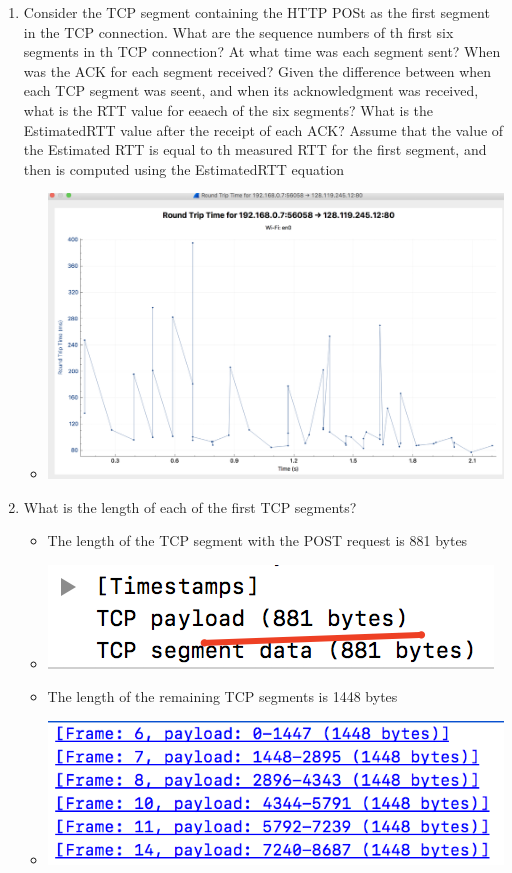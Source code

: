 \documentclass{article}
\begin{document}
\begin{enumerate}
    \item Consider the TCP segment containing the HTTP POSt as the first segment in the TCP connection.  What are the sequence numbers of th first six segments in th TCP connection?  At what time was each segment sent?  When was the ACK for each segment received?  Given the difference between when each TCP segment was seent, and when its acknowledgment was received, what is the RTT value for eeaech of the six segments?  What is the EstimatedRTT value after the receipt of each ACK?  Assume that the value of the Estimated RTT is equal to th measured RTT for the first segment, and then is computed using the EstimatedRTT equation
        \begin{itemize}
          \item \includegraphics[scale=0.3]{images/TCPRTT.png}
        \end{itemize}
    \item What is the length of each of the first TCP segments?
        \begin{itemize}
          \item The length of the TCP segment with the POST request is 881 bytes
          \item \includegraphics[scale=0.5]{images/TCPPOST.png}
          \item The length of the remaining TCP segments is 1448 bytes
          \item \includegraphics[scale=0.5]{images/TCPSG.png}
        \end{itemize}


\end{enumerate}
\end{document}
